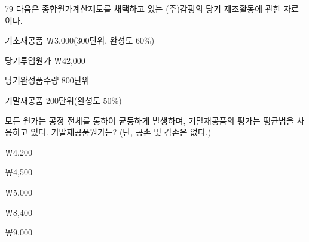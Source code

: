 \begin{question}{79}
다음은 종합원가계산제도를 채택하고 있는 (주)감평의 당기 제조활동에 관한 자료이다.
\begin{framedtext}
기초재공품 \quad ￦3,000(300단위, 완성도 60\%) \par
당기투입원가 \quad ￦42,000 \par
당기완성품수량 \quad 800단위 \par
기말재공품 \quad 200단위(완성도 50\%) \par
\end{framedtext}
모든 원가는 공정 전체를 통하여 균등하게 발생하며, 기말재공품의 평가는 평균법을 사용하고 있다. 기말재공품원가는? (단, 공손 및 감손은 없다.)
\begin{choices}
  \item ￦4,200
  \item ￦4,500
  \item ￦5,000
  \item ￦8,400
  \item ￦9,000
\end{choices}
\end{question}
